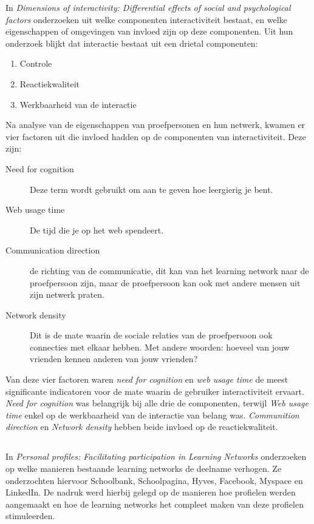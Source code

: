 \documentclass[a4paper, 10pt, pdftex]{report}
\begin{document}
      In \emph{Dimensions of interactivity: Differential effects of social and psychological factors} onderzoeken \citeauthor{Sohn2005} uit welke componenten interactiviteit bestaat, en welke eigenschappen of omgevingen van invloed zijn op deze componenten. Uit hun onderzoek blijkt dat interactie bestaat uit een drietal componenten:
        \begin{enumerate}
          \item Controle
          \item Reactiekwaliteit
          \item Werkbaarheid van de interactie
        \end{enumerate}
      Na analyse van de eigenschappen van proefpersonen en hun netwerk, kwamen er vier factoren uit die invloed hadden op de componenten van interactiviteit. Deze zijn:
        \begin{description}
          \item[Need for cognition]
            Deze term wordt gebruikt om aan te geven hoe leergierig je bent.
          \item[Web usage time]
            De tijd die je op het web spendeert.
          \item[Communication direction]
            de richting van de communicatie, dit kan van het learning network naar de proefpersoon zijn, maar de proefpersoon kan ook met andere mensen uit zijn netwerk praten.
          \item[Network density]
            Dit is de mate waarin de sociale relaties van de proefpersoon ook connecties met elkaar hebben. Met andere woorden: hoeveel van jouw vrienden kennen anderen van jouw vrienden?
        \end{description}
        Van deze vier factoren waren \emph{need for cognition} en \emph{web usage time} de meest significante indicatoren voor de mate waarin de gebruiker interactiviteit ervaart. \emph{Need for cognition} was belangrijk bij alle drie de componenten, terwijl \emph{Web usage time} enkel op de werkbaarheid van de interactie van belang was. \emph{Communition direction} en \emph{Network density} hebben beide invloed op de reactiekwaliteit.

    \subsection{\cite{Brouns2008}}

    In \emph{Personal profiles: Facilitating participation in Learning Networks} onderzoeken \citeauthor{Brouns2008} op welke manieren bestaande learning networks de deelname verhogen. Ze onderzochten hiervoor Schoolbank, Schoolpagina, Hyves, Facebook, Myspace en LinkedIn. De nadruk werd hierbij gelegd op de manieren hoe profielen werden aangemaakt en hoe de learning networks het compleet maken van deze profielen stimuleerden.
\end{document}
